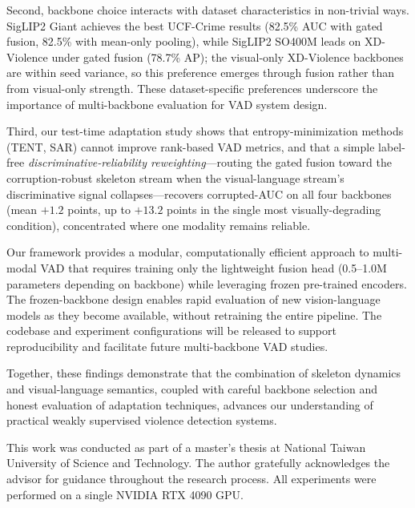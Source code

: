 \documentclass[sigconf]{acmart}
\begin{document}
Second, backbone choice interacts with dataset characteristics in non-trivial ways. SigLIP2 Giant achieves the best UCF-Crime results (82.5\% AUC with gated fusion, 82.5\% with mean-only pooling), while SigLIP2 SO400M leads on XD-Violence under gated fusion (78.7\% AP); the visual-only XD-Violence backbones are within seed variance, so this preference emerges through fusion rather than from visual-only strength. These dataset-specific preferences underscore the importance of multi-backbone evaluation for VAD system design.

Third, our test-time adaptation study shows that entropy-minimization methods (TENT, SAR) cannot improve rank-based VAD metrics, and that a simple label-free \emph{discriminative-reliability reweighting}---routing the gated fusion toward the corruption-robust skeleton stream when the visual-language stream's discriminative signal collapses---recovers corrupted-AUC on all four backbones (mean $+1.2$ points, up to $+13.2$ points in the single most visually-degrading condition), concentrated where one modality remains reliable.

Our framework provides a modular, computationally efficient approach to multi-modal VAD that requires training only the lightweight fusion head (0.5--1.0M parameters depending on backbone) while leveraging frozen pre-trained encoders. The frozen-backbone design enables rapid evaluation of new vision-language models as they become available, without retraining the entire pipeline. The codebase and experiment configurations will be released to support reproducibility and facilitate future multi-backbone VAD studies.

Together, these findings demonstrate that the combination of skeleton dynamics and visual-language semantics, coupled with careful backbone selection and honest evaluation of adaptation techniques, advances our understanding of practical weakly supervised violence detection systems.

\begin{acks}
This work was conducted as part of a master's thesis at National Taiwan University of Science and Technology.
The author gratefully acknowledges the advisor for guidance throughout the research process.
All experiments were performed on a single NVIDIA RTX 4090 GPU.
\end{acks}



\end{document}
